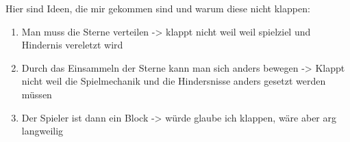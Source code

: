 \documentclass[11pt, a4paper]{article}
\begin{document}
Hier sind Ideen, die mir gekommen sind und warum diese nicht klappen:

\begin{enumerate}
    \item Man muss die Sterne verteilen -> klappt nicht weil weil spielziel und Hindernis vereletzt wird
    \item Durch das Einsammeln der Sterne kann man sich anders bewegen -> Klappt nicht weil die Spielmechanik und die Hindersnisse anders gesetzt werden müssen
    \item Der Spieler ist dann ein Block -> würde glaube ich klappen, wäre aber arg langweilig
\end{enumerate}
\end{document}
